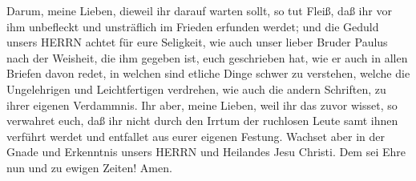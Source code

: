  Darum, meine Lieben, dieweil ihr darauf warten sollt, so
tut Fleiß, daß ihr vor ihm unbefleckt und unsträflich im Frieden
erfunden werdet;  und die Geduld unsers HERRN achtet für
eure Seligkeit, wie auch unser lieber Bruder Paulus nach der Weisheit,
die ihm gegeben ist, euch geschrieben hat,  wie er auch in
allen Briefen davon redet, in welchen sind etliche Dinge schwer zu
verstehen, welche die Ungelehrigen und Leichtfertigen verdrehen, wie
auch die andern Schriften, zu ihrer eigenen Verdammnis. 
Ihr aber, meine Lieben, weil ihr das zuvor wisset, so verwahret euch,
daß ihr nicht durch den Irrtum der ruchlosen Leute samt ihnen verführt
werdet und entfallet aus eurer eigenen Festung.  Wachset
aber in der Gnade und Erkenntnis unsers HERRN und Heilandes Jesu
Christi. Dem sei Ehre nun und zu ewigen Zeiten! Amen.
